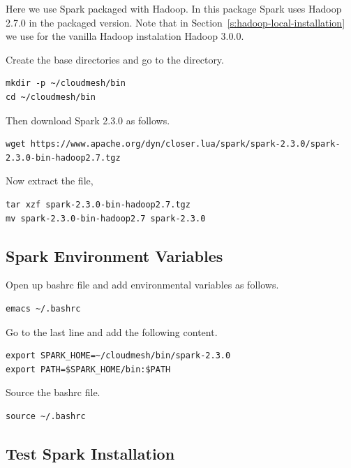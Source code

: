 \begin{NOTE}
  Here we use Spark packaged with Hadoop. In this package Spark uses
  Hadoop 2.7.0 in the packaged version. Note that in
  Section~\ref{s:hadoop-local-installation} we use for the vanilla
  Hadoop instalation Hadoop 3.0.0.
\end{NOTE}

Create the base directories and go to the directory.

\begin{lstlisting}
mkdir -p ~/cloudmesh/bin
cd ~/cloudmesh/bin
\end{lstlisting}
  
Then download Spark 2.3.0 as follows. 

\begin{lstlisting}
wget https://www.apache.org/dyn/closer.lua/spark/spark-2.3.0/spark-2.3.0-bin-hadoop2.7.tgz
\end{lstlisting}

Now extract the file,

\begin{lstlisting}
tar xzf spark-2.3.0-bin-hadoop2.7.tgz
mv spark-2.3.0-bin-hadoop2.7 spark-2.3.0
\end{lstlisting}

\subsection{Spark Environment Variables}

Open up bashrc file and add environmental variables as follows.

\begin{lstlisting}
emacs ~/.bashrc  
\end{lstlisting}

Go to the last line and add the following content.

\begin{lstlisting}
export SPARK_HOME=~/cloudmesh/bin/spark-2.3.0
export PATH=$SPARK_HOME/bin:$PATH
\end{lstlisting}  

Source the bashrc file.

\begin{lstlisting}
source ~/.bashrc
\end{lstlisting}

\subsection{Test Spark Installation}

